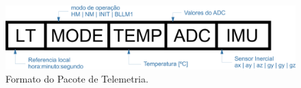 \begin{figure}[h]
	\centering
	
	\includegraphics[keepaspectratio=true,scale=0.5]{figuras/telemetryPacket.png}
	\caption{Formato do Pacote de Telemetria.}
	\label{telemetryPacket}
\end{figure}
\FloatBarrier

